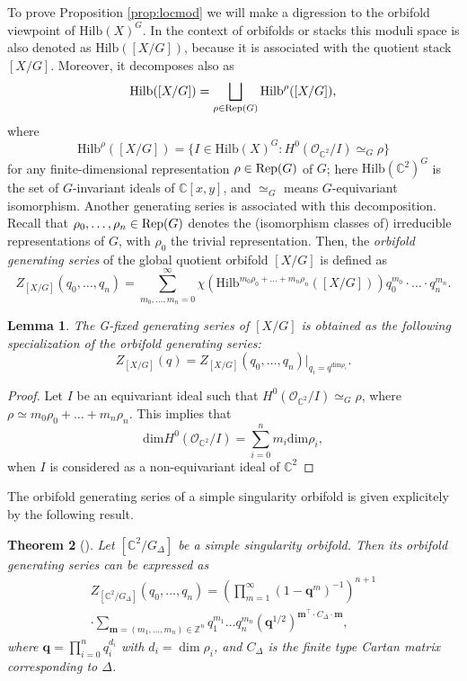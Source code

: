 \documentclass[11pt,a4paper]{amsart}
\newtheorem{theorem}{Theorem}[section]
\newtheorem{lemma}[theorem]{Lemma}
\theoremstyle{definition}
\newcommand{\SZ}{\mathbb{Z}}                    %
\newcommand{\SC}{\mathbb{C}}                    %
\begin{document}
To prove Proposition \ref{prop:locmod} we will make a digression to the orbifold viewpoint of $\mathrm{Hilb}(X)^G$. In the context of orbifolds or stacks this moduli space is also denoted as $\mathrm{Hilb}([X/G])$, because it is associated with the quotient stack $[X/G]$. Moreover, it decomposes also as
\[ \mathrm{Hilb}([X/G])=\bigsqcup_{\rho \in {\mathop{\rm Rep}}(G)}\mathrm{Hilb}^{\rho}([X/G]),\]
where
\[\mathrm{Hilb}^{\rho}([X/G])=  \{ I \in \mathrm{Hilb}(X)^G \colon H^0(\mathcal{O}_{\SC^2}/I) \simeq_G \rho \}\]
for any finite-dimensional representation $\rho\in {\mathop{\rm Rep}}(G)$ of $G$;
here $\mathrm{Hilb}(\SC^2)^G$ is the set of $G$-invariant ideals of $\SC[x,y]$, and $\simeq_G$ means $G$-equivariant isomorphism. 
Another generating series is associated with this decomposition. Recall that $\rho_0,\ldots,\rho_n\in\mathop{\rm Rep}(G)$ denotes the (isomorphism classes of) irreducible representations of $G$, with $\rho_0$ the trivial representation. Then, the \textit{orbifold generating series} of the global quotient orbifold $[X/G]$ is defined as
\[Z_{[X/G]}(q_0,\ldots, q_n)= \sum_{m_0,\dots,m_n=0}^\infty \chi\left(\mathrm{Hilb}^{m_0 \rho_0 + \ldots +m_n \rho_n}([X/G]) \right)   q_0^{m_0}\cdot \ldots \cdot q_n^{m_n}.\]
\begin{lemma} The G-fixed generating series of $[X/G]$ is obtained as the following specialization of the orbifold generating series:
 \[Z_{[X/G]}(q)=Z_{[X/G]}(q_0,\ldots, q_n)\Big|_{q_i=q^{\mathrm{dim} \rho_i}}.\]
\end{lemma}
\begin{proof}
Let $I$ be an equivariant ideal such that $H^0(\mathcal{O}_{\SC^2}/I) \simeq_G \rho$, where $\rho \simeq m_0 \rho_0 + \ldots +m_n \rho_n$. This implies that
\[\mathrm{dim} H^0(\mathcal{O}_{\SC^2}/I) = \sum_{i=0}^{n} m_i \mathrm{dim} \rho_i, \]
when $I$ is considered as a non-equivariant ideal of $\SC^2$
\end{proof}





The orbifold generating series of a simple singularity orbifold is given explicitely by the following result.
\begin{theorem}[\cite{nakajima2002geometric}]  
\label{thm:genfunct}
Let $[\SC^2/G_\Delta]$ be a simple singularity orbifold. Then its orbifold generating series can be expressed as
\begin{multline*} Z_{[\SC^2/G_\Delta]}(q_0,\dots,q_n)=\left(\prod_{m=1}^{\infty}(1-\mathbf{q}^m)^{-1}\right)^{n+1} \\
\cdot\sum_{ \mathbf{m}=(m_1,\dots,m_n) \in \SZ^n } q_1^{m_1}\dots q_n^{m_n}(\mathbf{q}^{1/2})^{\mathbf{m}^\top \cdot C_\Delta \cdot \mathbf{m}},\label{eq:orbi_main_formula}\end{multline*}
where $\mathbf{q}=\prod_{i=0}^n q_i^{d_i}$ with $d_i=\dim\rho_i$, 
and $C_\Delta$ is the finite type Cartan matrix corresponding to $\Delta$.
\end{theorem}
\end{document}
